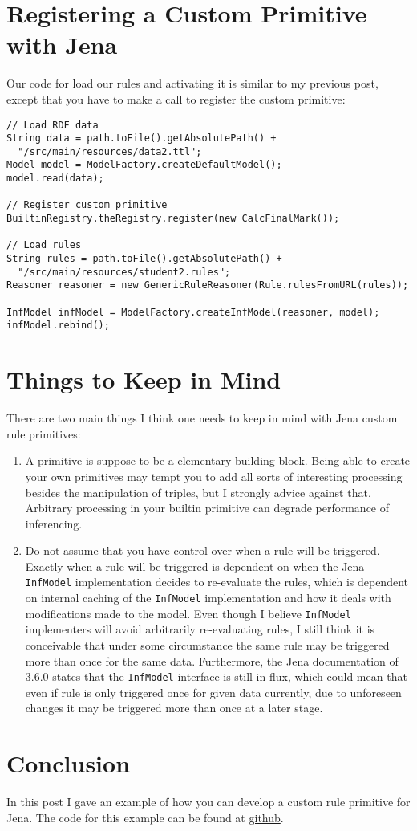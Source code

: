 \documentclass{amsart}
\begin{document}
\section{Registering a Custom Primitive with Jena}
Our code for load our rules and activating it is similar to my previous post, except that you have to make a call to register the custom primitive:
\begin{small}
\begin{verbatim} 
// Load RDF data
String data = path.toFile().getAbsolutePath() + 
  "/src/main/resources/data2.ttl";
Model model = ModelFactory.createDefaultModel();
model.read(data);
      
// Register custom primitive
BuiltinRegistry.theRegistry.register(new CalcFinalMark());
      
// Load rules
String rules = path.toFile().getAbsolutePath() + 
  "/src/main/resources/student2.rules";
Reasoner reasoner = new GenericRuleReasoner(Rule.rulesFromURL(rules));
     
InfModel infModel = ModelFactory.createInfModel(reasoner, model);  
infModel.rebind();   
\end{verbatim}
\end{small}


\section{Things to Keep in Mind}
There are two main things I think one needs to keep in mind with Jena custom rule primitives:
\begin{enumerate}
 \item A primitive is suppose to be a elementary building block. Being able to create your own primitives may tempt you to add all sorts of interesting processing besides the manipulation of triples, but I strongly advice against that. Arbitrary processing in your builtin primitive can degrade performance of inferencing.
 \item Do not assume that you have control over when a rule will be triggered. Exactly when a rule will be triggered is dependent on when the Jena \texttt{InfModel} implementation decides to re-evaluate the rules, which is dependent on internal caching of the \texttt{InfModel} implementation and how it deals with modifications made to the model. Even though I believe \texttt{InfModel} implementers will avoid arbitrarily re-evaluating rules, I still think it is conceivable that under some circumstance the same rule may be triggered more than once for the same data. Furthermore, the Jena documentation of 3.6.0 states that the \texttt{InfModel} interface is still in flux, which could mean that even if rule is only triggered once for given data currently, due to unforeseen changes it may be triggered more than once at a later stage.
\end{enumerate}

\section{Conclusion}
In this post I gave an example of how you can develop a custom rule primitive for Jena. The code for this example can be found at \href{http://}{github}.

  
  
 
\end{document}
